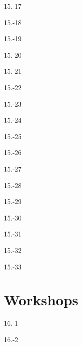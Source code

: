 \begin{exsol@solution}{15.-17}
\end{exsol@solution}
\begin{exsol@solution}{15.-18}
\end{exsol@solution}
\begin{exsol@solution}{15.-19}
\end{exsol@solution}
\begin{exsol@solution}{15.-20}
\end{exsol@solution}
\begin{exsol@solution}{15.-21}
\end{exsol@solution}
\begin{exsol@solution}{15.-22}
\end{exsol@solution}
\begin{exsol@solution}{15.-23}
\end{exsol@solution}
\begin{exsol@solution}{15.-24}
\end{exsol@solution}
\begin{exsol@solution}{15.-25}
\end{exsol@solution}
\begin{exsol@solution}{15.-26}
\end{exsol@solution}
\begin{exsol@solution}{15.-27}
\end{exsol@solution}
\begin{exsol@solution}{15.-28}
\end{exsol@solution}
\begin{exsol@solution}{15.-29}
\end{exsol@solution}
\begin{exsol@solution}{15.-30}
\end{exsol@solution}
\begin{exsol@solution}{15.-31}
\end{exsol@solution}
\begin{exsol@solution}{15.-32}
\end{exsol@solution}
\begin{exsol@solution}{15.-33}
\end{exsol@solution}
\setcounter{chapter}{16}\chapter{Workshops}
\begin{exsol@solution}{16.-1}
\end{exsol@solution}
\begin{exsol@solution}{16.-2}
\end{exsol@solution}
